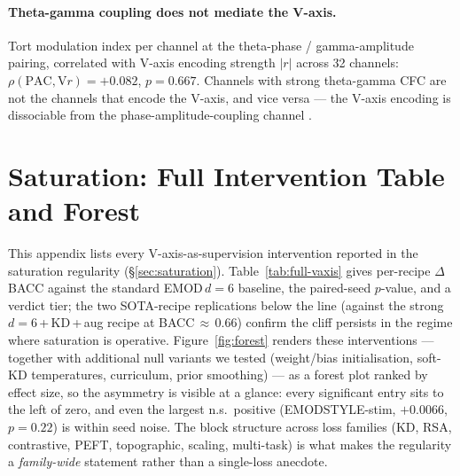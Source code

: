 \paragraph{Theta-gamma coupling does not mediate the V-axis.}
Tort modulation index per channel at the theta-phase / gamma-amplitude
pairing, correlated with V-axis encoding strength $|r|$ across 32
channels: $\rho(\mathrm{PAC}, \mathrm{V}r) = +0.082$, $p=0.667$. Channels
with strong theta-gamma CFC are not the channels that encode the V-axis,
and vice versa --- the V-axis encoding is dissociable from the
phase-amplitude-coupling channel \citep{canolty2010cfc}.


\section{Saturation: Full Intervention Table and Forest}
\label{app:full-vaxis-table}

This appendix lists every V-axis-as-supervision intervention reported in
the saturation regularity (\S\ref{sec:saturation}). Table~\ref{tab:full-vaxis}
gives per-recipe $\Delta$BACC against the standard EMOD\,$d{=}6$
baseline, the paired-seed $p$-value, and a verdict tier; the
two SOTA-recipe replications below the line (against the strong
$d{=}6$\,+\,KD\,+\,aug recipe at BACC$\,\approx\,0.66$) confirm the cliff
persists in the regime where saturation is operative.
Figure~\ref{fig:forest} renders these interventions --- together with
additional null variants we tested (weight/bias initialisation,
soft-KD temperatures, curriculum, prior smoothing) --- as a forest plot
ranked by effect size, so the asymmetry is visible at a glance: every
significant entry sits to the left of zero, and even the largest n.s.\
positive (EMODSTYLE-stim, $+0.0066$, $p{=}0.22$) is within seed noise.
The block structure across loss families (KD, RSA, contrastive, PEFT,
topographic, scaling, multi-task) is what makes the regularity a
\emph{family-wide} statement rather than a single-loss anecdote.

